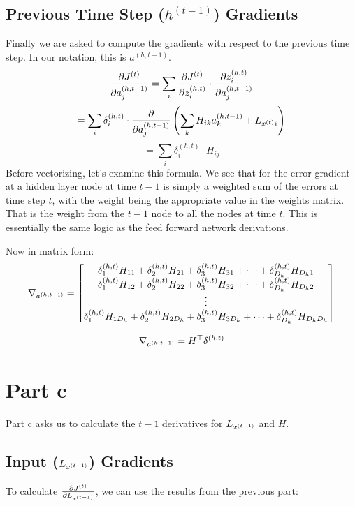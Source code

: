 \documentclass[]{article}
\newcommand{\deriv}[2]{%
	\ensuremath{\frac{\partial {#1}}{\partial {#2}}}}
\newcommand{\slayer}[3]{ %
	\ensuremath{{#1}^{(#2)}_{#3}}}
\newcommand{\vlayer}[2]{ %
	\ensuremath{{#1}^{(#2)}}}
\begin{document}
\subsection{Previous Time Step ($\vlayer{h}{t-1}$) Gradients}
Finally we are asked to compute the gradients with respect to the previous time step. In our notation, this is\vlayer{a}{h,t-1}.
$$\deriv{\vlayer{J}{t}}{\slayer{a}{h, t-1 }{j}} = \sum_i \deriv{\vlayer{J}{t}}{\slayer{z}{h,t}{i}} \cdot \deriv{\slayer{z}{h,t}{i}}{\slayer{a}{h,t-1}{j}}$$
$$ = \sum_i \slayer{\delta}{h,t}{i} \cdot \deriv{}{\slayer{a}{h,t-1}{j}}\left( \sum_k H_{ik}\slayer{a}{h,t-1}{k} + L_{\vlayer{x}{t}i} \right)$$
$$ = \sum_i \slayer{\delta}{h,t}{i} \cdot H_{ij}$$
Before vectorizing, let's examine this formula. We see that for the error gradient at a hidden layer node at time $t-1$ is simply a weighted sum of the errors at time step $t$, with the weight being the appropriate value in the weights matrix. That is the weight from the $t-1$ node to all the nodes at time $t$. This is essentially the same logic as the feed forward network derivations. 

Now in matrix form:
\[
\nabla_{\vlayer{a}{h,t-1}} = 
\begin{bmatrix}
\slayer{\delta}{h,t}{1}H_{11} + \slayer{\delta}{h,t}{2}H_{21} + \slayer{\delta}{h,t}{3}H_{31} + \dots + \slayer{\delta}{h,t}{D_h}H_{D_h1} \\
\slayer{\delta}{h,t}{1}H_{12} + \slayer{\delta}{h,t}{2}H_{22} + \slayer{\delta}{h,t}{3}H_{32} + \dots + \slayer{\delta}{h,t}{D_h}H_{D_h2} \\
\vdots \\
\slayer{\delta}{h,t}{1}H_{1D_h} + \slayer{\delta}{h,t}{2}H_{2D_h} + \slayer{\delta}{h,t}{3}H_{3D_h} + \dots + \slayer{\delta}{h,t}{D_h}H_{D_hD_h} \\

\end{bmatrix}
\]

\begin{equation} \label{eq:h,t-1}
\nabla_{\vlayer{a}{h,t-1}} = H^\top \vlayer{\delta}{h,t}
\end{equation}

\section{Part c}
Part c asks us to calculate the $t-1$ derivatives for $L_{\vlayer{x}{t-1}}$ and $H$.

\subsection{Input ($L_{\vlayer{x}{t-1}}$) Gradients}
To calculate $\deriv{\vlayer{J}{t}}{L_{\vlayer{x}{t-1}}}$, we can use the results from the previous part:
\end{document}
